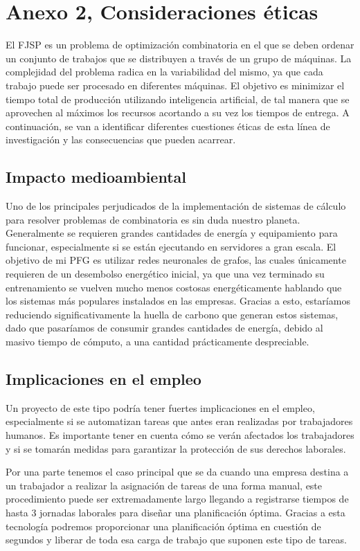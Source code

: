\section{Anexo 2, Consideraciones éticas}
El FJSP es un problema de optimización combinatoria en el que se deben ordenar un 
conjunto de trabajos que se distribuyen a través de un grupo de máquinas. La 
complejidad del problema radica en la variabilidad del mismo, ya que cada trabajo 
puede ser procesado en diferentes máquinas. El objetivo es minimizar el tiempo 
total de producción utilizando inteligencia artificial, de tal manera que se 
aprovechen al máximos los recursos acortando a su vez los tiempos de entrega. A 
continuación, se van a identificar diferentes cuestiones éticas de esta línea de 
investigación y las consecuencias que pueden acarrear.

\subsection{Impacto medioambiental}
Uno de los principales perjudicados de la implementación de sistemas de cálculo 
para resolver problemas de combinatoria es sin duda nuestro planeta. Generalmente 
se requieren grandes cantidades de energía y equipamiento para funcionar, 
especialmente si se están ejecutando en servidores a gran escala. El objetivo de 
mi PFG es utilizar redes neuronales de grafos, las cuales únicamente requieren de 
un desembolso energético inicial, ya que una vez terminado su entrenamiento se 
vuelven mucho menos costosas energéticamente hablando que los sistemas más populares 
instalados en las empresas. Gracias a esto, estaríamos reduciendo significativamente 
la huella de carbono que generan estos sistemas, dado que pasaríamos de consumir 
grandes cantidades de energía, debido al masivo tiempo de cómputo, a una cantidad 
prácticamente despreciable.

\subsection{Implicaciones en el empleo}
Un proyecto de este tipo podría tener fuertes implicaciones en el empleo, especialmente 
si se automatizan tareas que antes eran realizadas por trabajadores humanos. Es 
importante tener en cuenta cómo se verán afectados los trabajadores y si se tomarán 
medidas para garantizar la protección de sus derechos laborales.\medskip

Por una parte tenemos el caso principal que se da cuando una empresa destina a un 
trabajador a realizar la asignación de tareas de una forma manual, este procedimiento 
puede ser extremadamente largo llegando a registrarse tiempos de hasta 3 jornadas 
laborales para diseñar una planificación óptima. Gracias a esta tecnología podremos 
proporcionar una planificación óptima en cuestión de segundos y liberar de toda esa 
carga de trabajo que suponen este tipo de tareas.\medskip

